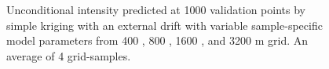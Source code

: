 \documentclass[review]{elsarticle}
\begin{document}
\begin{figure}[htbp]
    \quad
    \\
    \quad
    \\
\caption{Unconditional intensity predicted at 1000 validation points by simple kriging with an external drift with variable sample-specific model parameters from 400 \protect{}, 800 \protect{}, 1600 \protect{}, and 3200 \protect{} m grid. An average of 4 grid-samples.}
\label{fig:pr.pimu.reml}
\end{figure}
\end{document}
